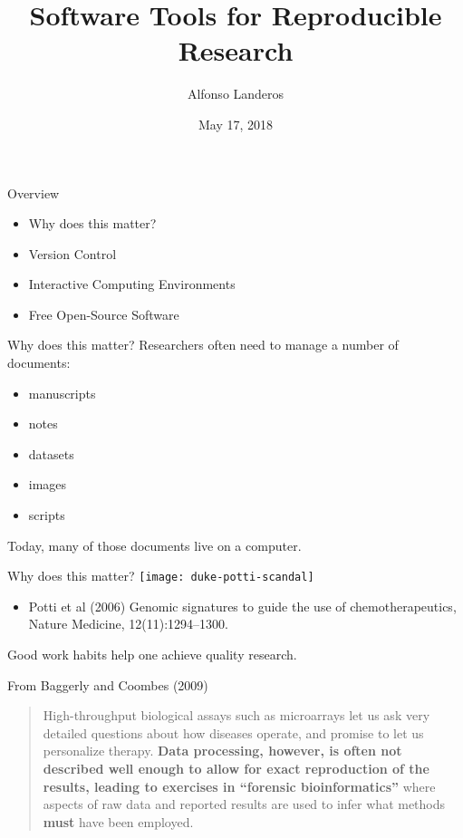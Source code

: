 \documentclass{beamer}
\title{Software Tools for Reproducible Research}
\author{Alfonso Landeros}
\date{May 17, 2018}
\begin{document}
\frame{\titlepage}

\begin{frame}{Overview}
  \begin{itemize}
    \item Why does this matter?

    \item Version Control

    \item Interactive Computing Environments

    \item Free Open-Source Software

  \end{itemize}
\end{frame}



\begin{frame}{Why does this matter?}
  Researchers often need to manage a number of documents: 
  \begin{itemize}
    \item manuscripts

    \item notes

    \item datasets

    \item images

    \item scripts
  \end{itemize}

  Today, many of those documents live on a computer.
\end{frame}

\begin{frame}{Why does this matter?}
  \center
  \texttt{[image: duke-potti-scandal]}

  \begin{itemize}
    \item \tiny Potti et al (2006) Genomic signatures to guide the use of chemotherapeutics, Nature Medicine, 12(11):1294--1300.
  \end{itemize}
  

  Good work habits help one achieve quality research.
\end{frame}

\begin{frame}{From Baggerly and Coombes (2009)}
  \begin{quotation}
    \noindent High-throughput biological assays such as microarrays let us ask very detailed questions about how diseases operate, and promise to let us personalize therapy.
    \textbf{Data processing, however, is often not described well enough to allow for exact reproduction of the results, leading to exercises in “forensic bioinformatics”} where aspects of raw data and reported results are used to infer what methods \textbf{must} have been employed.
  \end{quotation}
\end{frame}
\end{document}
